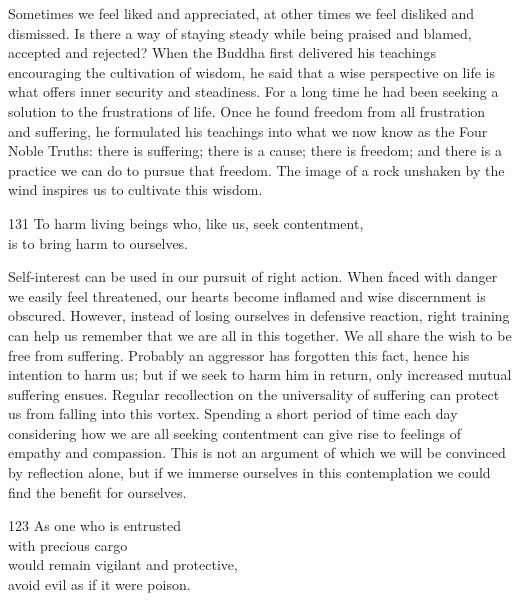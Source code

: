 \begin{dhpRefl}
  Sometimes we feel liked and appreciated, at other times we feel disliked and
  dismissed. Is there a way of staying steady while being praised and blamed,
  accepted and rejected? When the Buddha first delivered his teachings
  encouraging the cultivation of wisdom, he said that a wise perspective on life
  is what offers inner security and steadiness. For a long time he had been
  seeking a solution to the frustrations of life. Once he found freedom from all
  frustration and suffering, he formulated his teachings into what we now know
  as the Four Noble Truths: there is suffering; there is a cause; there is
  freedom; and there is a practice we can do to pursue that freedom. The image
  of a rock unshaken by the wind inspires us to cultivate this wisdom.
\end{dhpRefl}


\begin{dhpVerse}{131}
\label{dhp-131}
To harm living beings who, like us, seek contentment,\\
is to bring harm to ourselves.
\end{dhpVerse}

\begin{dhpRefl}
  Self-interest can be used in our pursuit of right action. When faced with
  danger we easily feel threatened, our hearts become inflamed and wise
  discernment is obscured. However, instead of losing ourselves in defensive
  reaction, right training can help us remember that we are all in this
  together. We all share the wish to be free from suffering. Probably an
  aggressor has forgotten this fact, hence his intention to harm us; but if we
  seek to harm him in return, only increased mutual suffering ensues. Regular
  recollection on the universality of suffering can protect us from falling into
  this vortex. Spending a short period of time each day considering how we are
  all seeking contentment can give rise to feelings of empathy and compassion.
  This is not an argument of which we will be convinced by reflection alone, but
  if we immerse ourselves in this contemplation we could find the benefit for
  ourselves.
\end{dhpRefl}


\begin{dhpVerse}{123}
\label{dhp-123}
As one who is entrusted\\
with precious cargo\\
would remain vigilant and protective,\\
avoid evil as if it were poison.
\end{dhpVerse}

